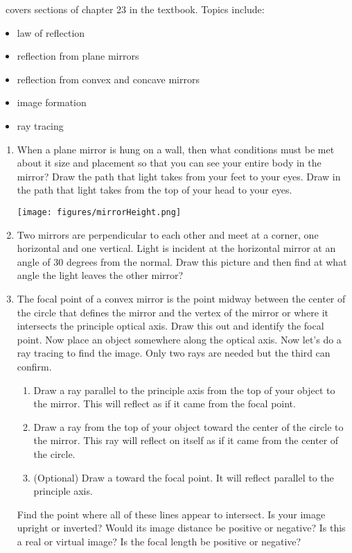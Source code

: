 \week \ covers sections of chapter 23 in the textbook. Topics include:

\begin{itemize}
	\item law of reflection
	\item reflection from plane mirrors
	\item reflection from convex and concave mirrors
	\item image formation
	\item ray tracing

\end{itemize}

\begin{enumerate}
\setlength\itemsep{2 in}

\item 
When a plane mirror is hung on a wall, then what conditions must be met about it size and placement so that you can see your entire body in the mirror? Draw the path that light takes from your feet to your eyes. Draw in the path that light takes from the top of your head to your eyes. 

\texttt{[image: figures/mirrorHeight.png]}

\item
Two mirrors are perpendicular to each other and meet at a corner, one horizontal and one vertical. Light is incident at the horizontal mirror at an angle of 30 degrees from the normal. Draw this picture and then find at what angle the light leaves the other mirror?

\item
The focal point of a convex mirror is the point midway between the center of the circle that defines the mirror and the vertex of the mirror or where it intersects the principle optical axis. Draw this out and identify the focal point. Now place an object somewhere along the optical axis. Now let's do a ray tracing to find the image. Only two rays are needed but the third can confirm.
\begin{enumerate}
	\item Draw a ray parallel to the principle axis from the top of your object to the mirror. This will reflect as if it came from the focal point.
	\item Draw a ray from the top of your object toward the center of the circle to the mirror. This ray will reflect on itself as if it came from the center of the circle.
	\item (Optional) Draw a toward the focal point. It will reflect parallel to the principle axis.
\end{enumerate}
Find the point where all of these lines appear to intersect. Is your image upright or inverted? Would its image distance be positive or negative? Is this a real or virtual image? Is the focal length be positive or negative?\giantskip


\end{enumerate}
